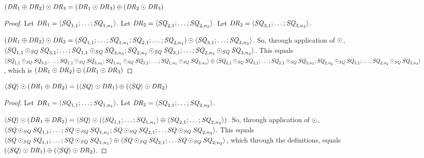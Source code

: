 \documentclass[numbers,10pt,preprint\ifanon ,nocopyrightspace\fi]{sigplanconf}
\begin{document}
\begin{lemma}
  \label{lem:dnf-distribute-right}
  $(\mathit{DR}_1 \oplus \mathit{DR}_2) \odot \mathit{DR}_3 =
  (\mathit{DR}_1 \odot \mathit{DR}_3) \oplus
  (\mathit{DR}_2 \odot \mathit{DR}_3)$
\end{lemma}
\begin{proof}
  Let $\mathit{DR}_1 = \langle\mathit{SQ}_{1,1};\ldots;\mathit{SQ}_{1,n_1}\rangle$.
  Let $\mathit{DR}_2 = \langle\mathit{SQ}_{2,1};\ldots;\mathit{SQ}_{2,n_2}\rangle$.
  Let $\mathit{DR}_3 = \langle\mathit{SQ}_{3,1};\ldots;\mathit{SQ}_{3,n_3}\rangle$.

  $(\mathit{DR}_1 \oplus \mathit{DR}_2) \odot \mathit{DR}_3 =
  (\mathit{SQ}_{1,1};\ldots;\mathit{SQ}_{1,n_1};
  \mathit{SQ}_{2,1};\ldots;\mathit{SQ}_{2,n_2}) \odot
  \langle\mathit{SQ}_{3,1};\ldots;\mathit{SQ}_{3,n_3}\rangle$.
  So, through application of $\odot$,
  $\langle\mathit{SQ}_{1,1}\odot_{\mathit{SQ}}\mathit{SQ}_{3,1};\ldots;
    \mathit{SQ}_{1,1}\odot_{\mathit{SQ}}\mathit{SQ}_{3,n_3};
    \mathit{SQ}_{2,n_2}\odot_{\mathit{SQ}}\mathit{SQ}_{3,1};\ldots;
    \mathit{SQ}_{2,n_2}\odot_{\mathit{SQ}}\mathit{SQ}_{3,n_3}\rangle$.  This equals
  $\langle\mathit{SQ}_{1,1}\odot_{\mathit{SQ}}\mathit{SQ}_{3,1};\ldots;
    \mathit{SQ}_{1,1}\odot_{\mathit{SQ}}\mathit{SQ}_{3,n_3};
    \mathit{SQ}_{1,n_1}\odot_{\mathit{SQ}}\mathit{SQ}_{3,1};\ldots;
    \mathit{SQ}_{1,n_1}\odot_{\mathit{SQ}}\mathit{SQ}_{3,n_3}\rangle \oplus
  \langle\mathit{SQ}_{2,1}\odot_{\mathit{SQ}}\mathit{SQ}_{3,1};\ldots;
    \mathit{SQ}_{2,1}\odot_{\mathit{SQ}}\mathit{SQ}_{3,n_3};
    \mathit{SQ}_{2,n_2}\odot_{\mathit{SQ}}\mathit{SQ}_{3,1};\ldots;
    \mathit{SQ}_{2,n_2}\odot_{\mathit{SQ}}\mathit{SQ}_{3,n_3}\rangle$, which is
  $(\mathit{DR}_1 \odot \mathit{DR}_2) \oplus
  (\mathit{DR}_1 \odot \mathit{DR}_3)$
\end{proof}

\begin{lemma}
  \label{lem:dnf-distribute-singleton-left}
  $\langle\mathit{SQ}\rangle \odot (\mathit{DR}_1 \oplus \mathit{DR}_2) =
  (\langle\mathit{SQ}\rangle \odot \mathit{DR}_1) \oplus
  (\langle\mathit{SQ}\rangle \odot \mathit{DR}_2)$
\end{lemma}
\begin{proof}
  Let $\mathit{DR}_1 = \langle\mathit{SQ}_{1,1};\ldots;\mathit{SQ}_{1,n_1}\rangle$.
  Let $\mathit{DR}_2 = \langle\mathit{SQ}_{2,1};\ldots;\mathit{SQ}_{2,n_2}\rangle$.

  $\langle\mathit{SQ}\rangle \odot (\mathit{DR}_1 \oplus \mathit{DR}_2) =
  \langle\mathit{SQ}\rangle \odot
  (\langle\mathit{SQ}_{1,1};\ldots;\mathit{SQ}_{1,n_1}\rangle \oplus
  \langle\mathit{SQ}_{2,1};\ldots;\mathit{SQ}_{2,n_2}\rangle)$.
  So, through application of $\odot$,
  $\langle\mathit{SQ}\odot_{\mathit{SQ}}\mathit{SQ}_{1,1};\ldots;
    \mathit{SQ}\odot_{\mathit{SQ}}\mathit{SQ}_{1,n_1};
    \mathit{SQ}\odot_{\mathit{SQ}}\mathit{SQ}_{2,1};\ldots
    \mathit{SQ}\odot_{\mathit{SQ}}\mathit{SQ}_{2,n_2}\rangle$.
  This equals
  $\langle\mathit{SQ}\odot_{\mathit{SQ}}\mathit{SQ}_{1,1};\ldots;
    \mathit{SQ}\odot_{\mathit{SQ}}\mathit{SQ}_{1,n_1}\rangle \oplus
  \langle\mathit{SQ}\odot_{\mathit{SQ}}\mathit{SQ}_{2,1};\ldots
    \mathit{SQ}\odot_{\mathit{SQ}}\mathit{SQ}_{2,n_2}\rangle$, which through the definitions,
  equals
  $(\langle\mathit{SQ}\rangle \odot \mathit{DR}_1) \oplus
  (\langle\mathit{SQ}\rangle \odot \mathit{DR}_2)$.
\end{proof}
\end{document}
